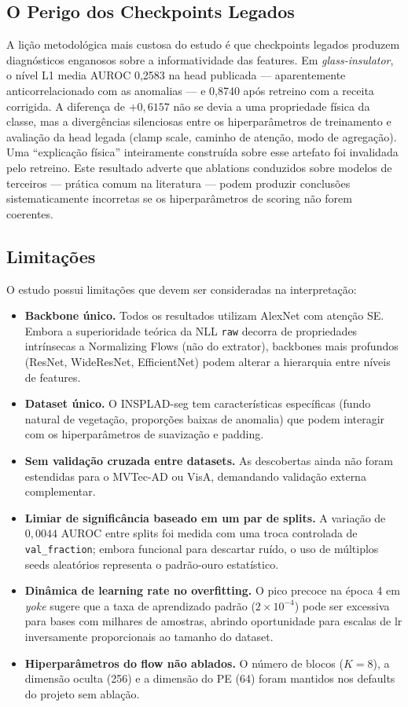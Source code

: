 \documentclass[conference]{IEEEtran}
\begin{document}
\subsection{O Perigo dos Checkpoints Legados}

A lição metodológica mais custosa do estudo é que checkpoints legados produzem diagnósticos enganosos sobre a informatividade das features. Em \textit{glass-insulator}, o nível L1 media AUROC 0{,}2583 na head publicada --- aparentemente anticorrelacionado com as anomalias --- e 0{,}8740 após retreino com a receita corrigida. A diferença de $+0{,}6157$ não se devia a uma propriedade física da classe, mas a divergências silenciosas entre os hiperparâmetros de treinamento e avaliação da head legada (clamp scale, caminho de atenção, modo de agregação). Uma ``explicação física'' inteiramente construída sobre esse artefato foi invalidada pelo retreino. Este resultado adverte que ablations conduzidos sobre modelos de terceiros --- prática comum na literatura --- podem produzir conclusões sistematicamente incorretas se os hiperparâmetros de scoring não forem coerentes.

\subsection{Limitações}

O estudo possui limitações que devem ser consideradas na interpretação:

\begin{itemize}
    \item \textbf{Backbone único.} Todos os resultados utilizam AlexNet com atenção SE. Embora a superioridade teórica da NLL \texttt{raw} decorra de propriedades intrínsecas a Normalizing Flows (não do extrator), backbones mais profundos (ResNet, WideResNet, EfficientNet) podem alterar a hierarquia entre níveis de features.
    \item \textbf{Dataset único.} O INSPLAD-seg tem características específicas (fundo natural de vegetação, proporções baixas de anomalia) que podem interagir com os hiperparâmetros de suavização e padding.
    \item \textbf{Sem validação cruzada entre datasets.} As descobertas ainda não foram estendidas para o MVTec-AD ou VisA, demandando validação externa complementar.
    \item \textbf{Limiar de significância baseado em um par de splits.} A variação de $0{,}0044$ AUROC entre splits foi medida com uma troca controlada de \texttt{val\_fraction}; embora funcional para descartar ruído, o uso de múltiplos seeds aleatórios representa o padrão-ouro estatístico.
    \item \textbf{Dinâmica de learning rate no overfitting.} O pico precoce na época 4 em \textit{yoke} sugere que a taxa de aprendizado padrão ($2 \times 10^{-4}$) pode ser excessiva para bases com milhares de amostras, abrindo oportunidade para escalas de lr inversamente proporcionais ao tamanho do dataset.
    \item \textbf{Hiperparâmetros do flow não ablados.} O número de blocos ($K=8$), a dimensão oculta (256) e a dimensão do PE (64) foram mantidos nos defaults do projeto sem ablação.
\end{itemize}
\end{document}
